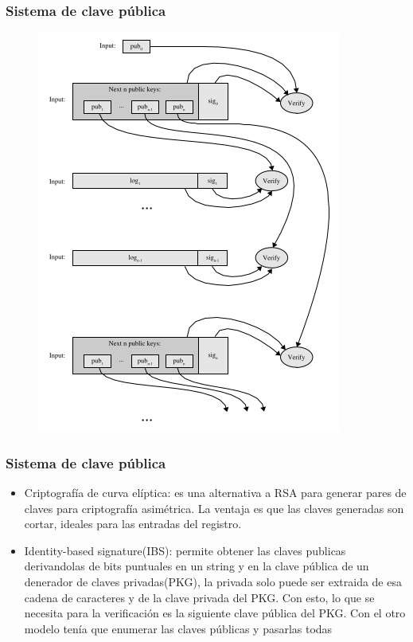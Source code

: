 \documentclass[10pt, a4paper,english,spanish]{beamer}
\begin{document}
\begin{frame}
\frametitle{Sistema de clave pública}
\begin{figure}
  \includegraphics[scale=0.4]{imagenes/PublicKeyVerification.png}
\end{figure}
\end{frame}

\begin{frame}
\frametitle{Sistema de clave pública}
\begin{itemize}
  \item Criptografía de curva elíptica: es una alternativa a RSA para generar pares de claves para
  criptografía asimétrica. La ventaja es que las claves generadas son cortar, ideales para las entradas
  del registro.
  \item Identity-based signature(IBS): permite obtener las claves publicas derivandolas de bits puntuales en
  un string y en la clave pública de un denerador de claves privadas(PKG), la privada solo puede ser extraida
  de esa cadena de caracteres y de la clave privada del PKG. Con esto, lo que se necesita
  para la verificación es la siguiente clave pública del PKG. Con el otro modelo tenía que enumerar las claves
  públicas y pasarlas todas
\end{itemize}
\end{frame}
\end{document}
